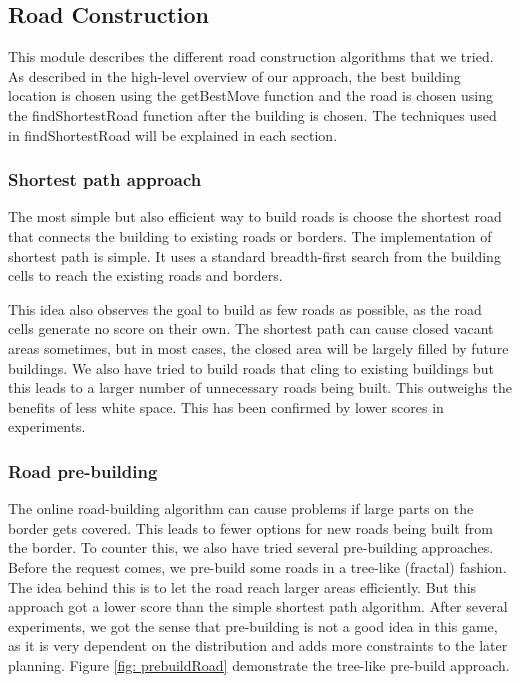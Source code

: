 \subsection{Road Construction}
This module describes the different road construction algorithms that we tried. As described in the high-level overview of our approach, the best building location is chosen using the getBestMove function and the road is chosen using the findShortestRoad function after the building is chosen. The techniques used in findShortestRoad will be explained in each section.

\subsubsection{Shortest path approach}
The most simple but also efficient way to build roads is choose the shortest road that connects the building to existing roads or borders. The implementation of shortest path is simple. It uses a standard breadth-first search from the building cells to reach the existing roads and borders. 

This idea also observes the goal to build as few roads as possible, as the road cells generate no score on their own. The shortest path can cause closed vacant areas sometimes, but in most cases, the closed area will be largely filled by future buildings. We also have tried to build roads that cling to existing buildings but this leads to a larger number of unnecessary roads being built. This outweighs the benefits of less white space. This has been confirmed by lower scores in experiments.

\subsubsection{Road pre-building}
The online road-building algorithm can cause problems if large parts on the border gets covered. This leads to fewer options for new roads being built from the border. To counter this, we also have tried several pre-building approaches. Before the request comes, we pre-build some roads in a tree-like (fractal) fashion. The idea behind this is to let the road reach larger areas efficiently. But this approach got a lower score than the simple shortest path algorithm. After several experiments, we got the sense that pre-building is not a good idea in this game, as it is very dependent on the distribution and adds more constraints to the later planning.
Figure \ref{fig: prebuildRoad} demonstrate the tree-like pre-build approach.

